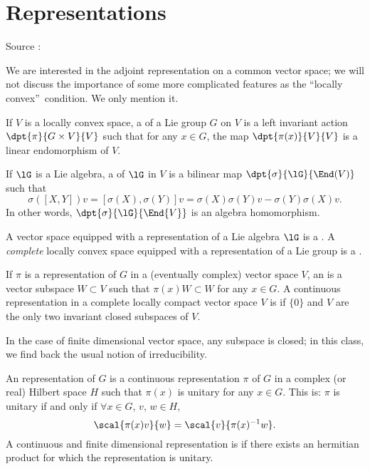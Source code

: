 \section{Representations}
Source :\cite{Lie_groups}

We are interested in the adjoint representation on a common vector space; we will not discuss the importance of some more complicated features as the ``locally convex''\ condition. We only mention it.

\begin{definition}
If $V$ is a locally convex space, a  of a Lie group $G$ on $V$ is a left invariant action $\dpt{\pi}{G\times V}{V}$ such that for any $x\in G$, the map $\dpt{\pi(x)}{V}{V}$ is a linear endomorphism of $V$.
\end{definition}

If $\lG$ is a Lie algebra, a  of $\lG$ in $V$ is a bilinear map $\dpt{\sigma}{\lG}{\End(V)}$ such that 
\begin{equation}
    \sigma([X,Y])v=[\sigma(X),\sigma(Y)]v=\sigma(X)\sigma(Y)v-\sigma(Y)\sigma(X)v.
\end{equation}
In other words, $\dpt{\sigma}{\lG}{\End{V}}$ is an algebra homomorphism.

A vector space equipped with a representation of a Lie algebra $\lG$ is a . A \emph{complete} locally convex space equipped with a representation of a Lie group is a . 

If $\pi$ is a representation of $G$ in a (eventually complex) vector space $V$, an  is a vector subspace $W\subset V$ such that $\pi(x)W\subset W$ for any $x\in G$. A continuous representation in a complete locally compact vector space $V$ is  if $\{0\}$ and $V$ are the only two invariant closed subspaces of $V$.

In the case of finite dimensional vector space, any subspace is closed; in this class, we find back the usual notion of irreducibility.

An  representation of $G$ is a continuous representation $\pi$ of $G$ in a complex (or real) Hilbert space $H$ such that $\pi(x)$ is unitary for any $x\in G$. This is: $\pi$ is unitary if and only if $\forall x\in G$, $v$, $w\in H$,
\begin{equation}
\scal{\pi(x)v}{w}=\scal{v}{\pi(x)^{-1} w}.
\end{equation}
A continuous and finite dimensional representation is  if there exists an hermitian product for which the representation is unitary.

